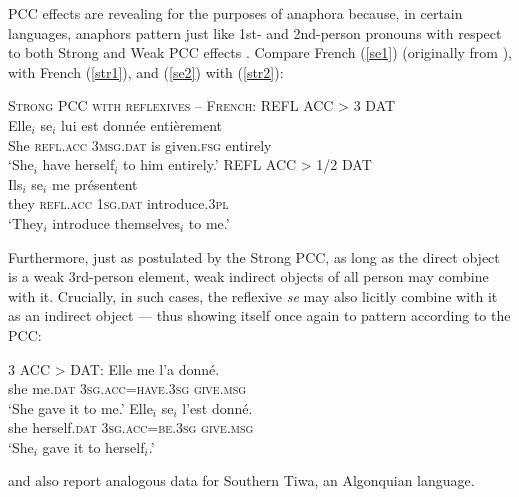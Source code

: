 \documentclass[output=paper, modfonts, nonflat]{langsci/langscibook}
\begin{document}
\noindent PCC effects are revealing for the purposes of anaphora because, in
certain languages, anaphors pattern just like 1st- and 2nd-person
pronouns with respect to both Strong and Weak PCC effects
\citep{kayne:1975, herschensohn:1979, bonet:1991, anag:2003,
  anag:2005, rivero:2004, nevins:2007, adgerharbour:2007}. Compare
French (\ref{se1}) (originally from \citealt[173]{kayne:1975}), with
French (\ref{str1}), and (\ref{se2}) with (\ref{str2}):

\ea\label{rpcc} \textsc{Strong PCC with reflexives -- French:}
  \ea\label{se1}  REFL ACC > 3 DAT\\
\gll *Elle$_i$ se$_i$ lui est donn\'ee enti\`erement\\
She \textsc{refl.acc} \textsc{3msg.dat} is given.\textsc{fsg}
entirely\\
\glt `She$_i$ have herself$_i$ to him entirely.'
\ex\label{se2}  REFL ACC > 1/2 DAT\\
\gll *Ils$_i$ se$_i$ me pr\'esentent\\
they \textsc{refl.acc} \textsc{1sg.dat} introduce.\textsc{3pl}\\
\glt `They$_i$ introduce themselves$_i$ to me.'
\z
\z

\noindent Furthermore, just as postulated by the Strong PCC, as long as the
direct object is a weak 3rd-person element, weak indirect objects of
all person may combine with it. Crucially, in such cases, the
reflexive \textit{se} may also licitly combine with it as an indirect
object --- thus showing itself once again to pattern according to the
PCC:

\ea\label{goodpcc}  3 ACC > DAT:
\ea\label{mepcc}\gll Elle me l'a donn\'e.\\
she me.\textsc{dat} {\textsc{3sg.acc=have.3sg}} \textsc{give.msg}\\
\glt `She gave it to me.'
\ex\label{sepcc}\gll Elle$_i$ se$_i$ l'est donn\'e.\\
she herself.\textsc{dat} \textsc{3sg.acc=be.3sg} \textsc{give.msg}\\
\glt `She$_i$ gave it to herself$_i$.'  \z \z

\noindent \citet{rosen:1990} and \citet{baker:2008} also report analogous data for
Southern Tiwa, an Algonquian language. 

\end{document}
